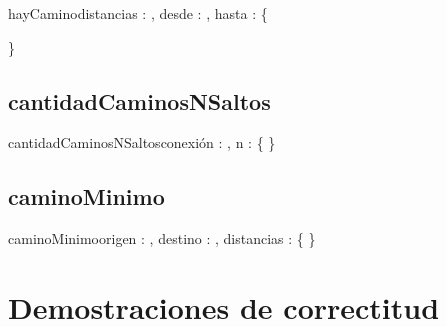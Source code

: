 \documentclass[10pt,a4paper]{article}
\begin{document}
\begin{proc}{hayCamino}{\In distancias : \TLista{\TLista{\ent}}, \In desde : \ent, \In hasta : \ent}{\bool \{ } 
	
	\}
\end{proc}

\subsection{cantidadCaminosNSaltos}

\begin{proc}{cantidadCaminosNSaltos}{\Inout conexión : \TLista{\TLista{\ent}}, \In n : \ent}{ \{ } 
	\requiere{\{ \True\}}
	\asegura{\{\True\}}
	\}
\end{proc}

\subsection{caminoMinimo}

\begin{proc}{caminoMinimo}{\In origen : \ent, \In destino : \ent, \In distancias : \TLista{\TLista{\ent}}}{\TLista{\ent} \{ } 
	\requiere{\{ \True \}}
	\asegura{\{\True\}}
	\}
\end{proc}

\section{Demostraciones de correctitud}
\end{document}

